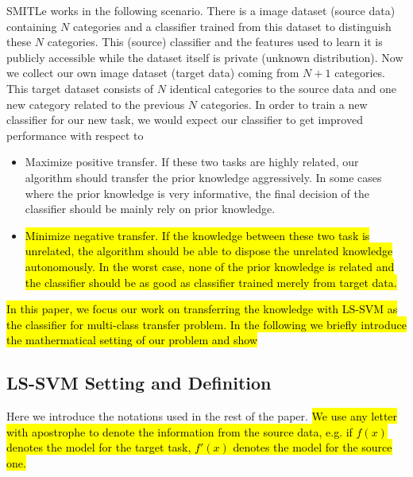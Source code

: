 SMITLe works in the following scenario. There is a image dataset (source data) containing $N$ categories and a classifier trained from this dataset to distinguish these $N$ categories. This (source) classifier and the features used to learn it is publicly accessible while the dataset itself is private (unknown distribution).  Now we collect our own image dataset (target data) coming from $N+1$ categories. This target dataset consists of $N$ identical categories to the source data and one new category related to the previous $N$ categories. In order to train a new classifier for our new task, we would expect our classifier to get improved performance with respect to 
\begin{itemize}
\item Maximize positive transfer. If these two tasks are highly related, our algorithm should transfer the prior knowledge aggressively. In some cases where the prior knowledge is very informative, the final decision of the classifier should be mainly rely on prior knowledge.
\item \hl{Minimize negative transfer. If the knowledge between these two task is unrelated, the algorithm should be able to dispose the unrelated knowledge autonomously. In the worst case, none of the prior knowledge is related and the classifier should be as good as classifier trained merely from target data.}
\end{itemize}

\hl{In this paper, we focus our work on transferring the knowledge with LS-SVM as the classifier for multi-class transfer problem. In the following we briefly introduce the mathermatical setting of our problem and show   }

\subsection{LS-SVM Setting and Definition}
Here we introduce the notations used in the rest of the paper. \hl{We use any letter with apostrophe to denote the information from the source data, e.g. if $f(x)$ denotes the model for the target task, $f'(x)$ denotes the model for the source one.}

